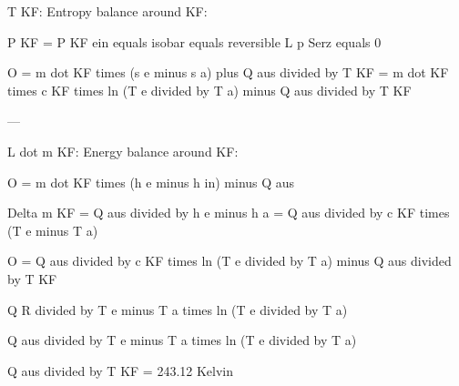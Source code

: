 T KF: Entropy balance around KF:  

P KF = P KF ein equals isobar equals reversible  
L p Serz equals 0  

O = m dot KF times (s e minus s a) plus Q aus divided by T KF  
= m dot KF times c KF times ln (T e divided by T a) minus Q aus divided by T KF  

---

L dot m KF: Energy balance around KF:  

O = m dot KF times (h e minus h in) minus Q aus  

Delta m KF = Q aus divided by h e minus h a  
= Q aus divided by c KF times (T e minus T a)  

O = Q aus divided by c KF times ln (T e divided by T a) minus Q aus divided by T KF  

Q R divided by T e minus T a times ln (T e divided by T a)  

Q aus divided by T e minus T a times ln (T e divided by T a)  

Q aus divided by T KF = 243.12 Kelvin